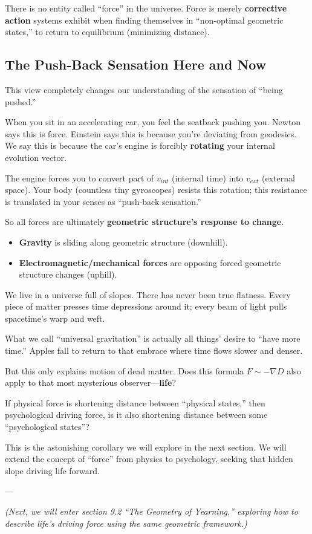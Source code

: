 There is no entity called ``force'' in the universe. Force is merely \textbf{corrective action} systems exhibit when finding themselves in ``non-optimal geometric states,'' to return to equilibrium (minimizing distance).

\subsection{The Push-Back Sensation Here and Now}

This view completely changes our understanding of the sensation of ``being pushed.''

When you sit in an accelerating car, you feel the seatback pushing you. Newton says this is force. Einstein says this is because you're deviating from geodesics. We say this is because the car's engine is forcibly \textbf{rotating} your internal evolution vector.

The engine forces you to convert part of $v_{int}$ (internal time) into $v_{ext}$ (external space). Your body (countless tiny gyroscopes) resists this rotation; this resistance is translated in your senses as ``push-back sensation.''

So all forces are ultimately \textbf{geometric structure's response to change}.

\begin{itemize}
\item \textbf{Gravity} is sliding along geometric structure (downhill).

\item \textbf{Electromagnetic/mechanical forces} are opposing forced geometric structure changes (uphill).
\end{itemize}

We live in a universe full of slopes. There has never been true flatness. Every piece of matter presses time depressions around it; every beam of light pulls spacetime's warp and weft.

What we call ``universal gravitation'' is actually all things' desire to ``have more time.'' Apples fall to return to that embrace where time flows slower and denser.

But this only explains motion of dead matter. Does this formula $F \sim -\nabla D$ also apply to that most mysterious observer---\textbf{life}?

If physical force is shortening distance between ``physical states,'' then psychological driving force, is it also shortening distance between some ``psychological states''?

This is the astonishing corollary we will explore in the next section. We will extend the concept of ``force'' from physics to psychology, seeking that hidden slope driving life forward.

---

\textit{(Next, we will enter section 9.2 ``The Geometry of Yearning,'' exploring how to describe life's driving force using the same geometric framework.)}

